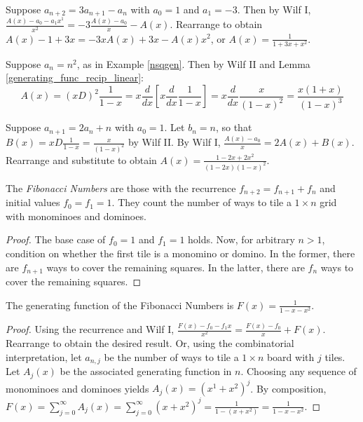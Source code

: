 \documentclass[a4paper]{article}
\begin{document}
\begin{example}
Suppose $a_{n+2}=3a_{n+1}-a_n$ with $a_0=1$ and $a_1=-3$. Then by Wilf I, $\frac{A(x)-a_0-a_1x^1}{x^2}=-3\frac{A(x)-a_0}x-A(x)$. Rearrange to obtain $A(x)-1+3x=-3xA(x)+3x-A(x)x^2$, or $A(x)=\frac1{1+3x+x^2}$.
\end{example}

\begin{example}
Suppose $a_n=n^2$, as in Example \ref{nsqgen}. Then by Wilf II and Lemma \ref{generating_func_recip_linear}:
\begin{equation*}
A(x)
=(xD)^2\frac1{1-x}
=x\frac{d}{dx}\left[x\frac d{dx}\frac1{1-x}\right]
=x\frac{d}{dx}\frac x{(1-x)^2}
=\frac{x(1+x)}{(1-x)^3}
\end{equation*}
\end{example}

\begin{example}
Suppose $a_{n+1}=2a_n+n$ with $a_0=1$. Let $b_n=n$, so that $\displaystyle B(x)=xD\frac1{1-x}=\frac x{(1-x)^2}$ by Wilf II. By Wilf I, $\frac{A(x)-a_0}x=2A(x)+B(x)$. Rearrange and substitute to obtain $A(x)=\frac{1-2x+2x^2}{(1-2x)(1-x)^2}$.
\end{example}

\begin{definition}
The \emph{Fibonacci Numbers} are those with the recurrence $f_{n+2}=f_{n+1}+f_n$ and initial values $f_0=f_1=1$. They count the number of ways to tile a $1\times n$ grid with monominoes and dominoes.

\begin{hl}
\begin{proof}
The base case of $f_0=1$ and $f_1=1$ holds. Now, for arbitrary $n>1$, condition on whether the first tile is a monomino or domino. In the former, there are $f_{n+1}$ ways to cover the remaining squares. In the latter, there are $f_n$ ways to cover the remaining squares.
\end{proof}
\end{hl}
\end{definition}

\begin{lemma}
The generating function of the Fibonacci Numbers is $\displaystyle F(x)=\frac1{1-x-x^2}$.

\begin{hl}
\begin{proof}
Using the recurrence and Wilf I, $\frac{F(x)-f_0-f_1x}{x^2}=\frac{F(x)-f_0}x+F(x)$. Rearrange to obtain the desired result. Or, using the combinatorial interpretation, let $a_{n,j}$ be the number of ways to tile a $1\times n$ board with $j$ tiles. Let $A_j(x)$ be the associated generating function in $n$. Choosing any sequence of monominoes and dominoes yields $A_j(x)=(x^1+x^2)^j$. By composition, $F(x)=\sum_{j=0}^\infty A_j(x)=\sum_{j=0}^\infty(x+x^2)^j=\frac1{1-(x+x^2)}=\frac1{1-x-x^2}$.
\end{proof}
\end{hl}
\end{lemma}
\end{document}
